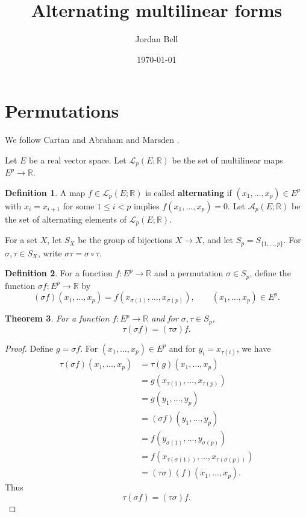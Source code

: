 \documentclass{amsart}
\newtheorem{theorem}{Theorem}
\theoremstyle{definition}
\newtheorem{definition}[theorem]{Definition}
\begin{document}
\title{Alternating multilinear forms}
\author{Jordan Bell}
\address{Department of Mathematics, University of Toronto, Toronto, Ontario, Canada}
\date{\today}
\maketitle

\section{Permutations}
We follow Cartan \cite{cartan} and Abraham and Marsden \cite{abraham}.

Let $E$ be a real vector space.
Let $\mathscr{L}_p(E;\mathbb{R})$ be the set of multilinear maps $E^p \to \mathbb{R}$. 

\begin{definition}
A map $f \in \mathscr{L}_p(E;\mathbb{R})$ is called \textbf{alternating} if
$(x_1,\ldots,x_p) \in E^p$ with $x_i=x_{i+1}$ for some $1 \leq i < p$ implies $f(x_1,\ldots,x_p)=0$.
Let $\mathscr{A}_p(E;\mathbb{R})$ be the set of alternating elements of $\mathscr{L}_p(E;\mathbb{R})$.
\end{definition}

For a set $X$, let $S_X$ be the group of bijections $X \to X$, and let
$S_p=S_{\{1,\ldots,p\}}$.
For $\sigma,\tau \in S_X$, write $\sigma \tau = \sigma \circ \tau$.

\begin{definition}
For a function $f:E^p \to \mathbb{R}$ and a permutation $\sigma \in S_p$, define the function
$\sigma f:E^p \to \mathbb{R}$ by 
\[
(\sigma f)(x_1,\ldots,x_p) = f(x_{\sigma(1)},\ldots,x_{\sigma(p)}), \qquad (x_1,\ldots,x_p) \in E^p.
\]
\end{definition}

\begin{theorem}
For a function $f:E^p \to \mathbb{R}$ and for $\sigma,\tau \in S_p$,
\[
\tau(\sigma f) = (\tau \sigma) f.
\]
\label{action}
\end{theorem}
\begin{proof}
Define
 $g=\sigma f$. For $(x_1,\ldots,x_p) \in E^p$ and for 
$y_i = x_{\tau(i)}$, we have
\begin{align*}
\tau(\sigma f)(x_1,\ldots,x_p)&=\tau(g)(x_1,\ldots,x_p)\\
&=g(x_{\tau(1)},\ldots,x_{\tau(p)})\\
&=g(y_1,\ldots,y_p)\\
&=(\sigma f)(y_1,\ldots,y_p)\\
&=f(y_{\sigma(1)},\ldots,y_{\sigma(p)})\\
&=f(x_{\tau(\sigma(1))},\ldots,x_{\tau(\sigma(p))})\\
&=(\tau \sigma)(f)(x_1,\ldots,x_p).
\end{align*}
Thus
\[
\tau(\sigma f) = (\tau \sigma) f.
\]
\end{proof}
\end{document}
